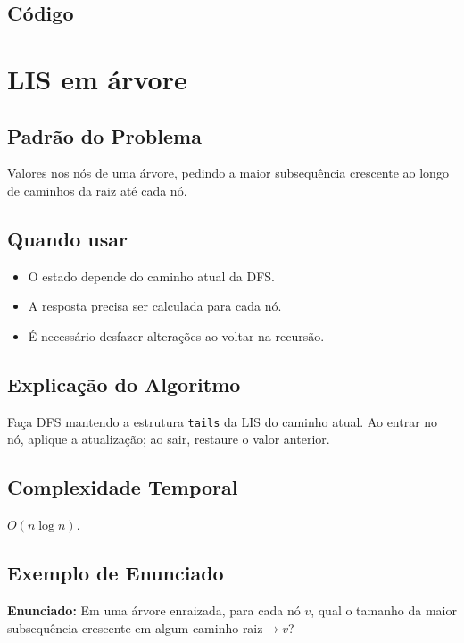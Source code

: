\subsection{Código}

\section{LIS em árvore}

\subsection{Padrão do Problema}
Valores nos nós de uma árvore, pedindo a maior subsequência crescente ao longo de caminhos da raiz até cada nó.

\subsection{Quando usar}
\begin{itemize}[nosep]
  \item O estado depende do caminho atual da DFS.
  \item A resposta precisa ser calculada para cada nó.
  \item É necessário desfazer alterações ao voltar na recursão.
\end{itemize}

\subsection{Explicação do Algoritmo}
Faça DFS mantendo a estrutura \texttt{tails} da LIS do caminho atual. Ao entrar no nó, aplique a atualização; ao sair, restaure o valor anterior.

\subsection{Complexidade Temporal}
$O(n \log n)$.

\subsection{Exemplo de Enunciado}
\begin{exemplodiabox}
\textbf{Enunciado:} Em uma árvore enraizada, para cada nó $v$, qual o tamanho da maior subsequência crescente em algum caminho raiz$\rightarrow v$?
\end{exemplodiabox}

